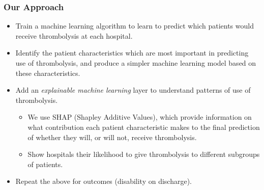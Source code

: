 \begin{frame}
\frametitle{Our Approach}

\small

\begin{itemize}
    \item Train a machine learning algorithm to learn to predict which patients would receive thrombolysis at each hospital. %
    \item Identify the patient characteristics which are most important in predicting use of thrombolysis, and produce a simpler machine learning model based on these characteristics. %
    \item Add an \emph{explainable machine learning} layer to understand patterns of use of thrombolysis.
    \begin{itemize}
        \footnotesize
        \item We use SHAP (Shapley Additive Values), which provide information on what contribution each patient characteristic makes to the final prediction of whether they will, or will not, receive thrombolysis. %
    \item Show hospitals their likelihood to give thrombolysis to different subgroups of patients.    
    \end{itemize}
    \item Repeat the above for outcomes (disability on discharge).
\end{itemize}

\vspace{3mm}

\end{frame}